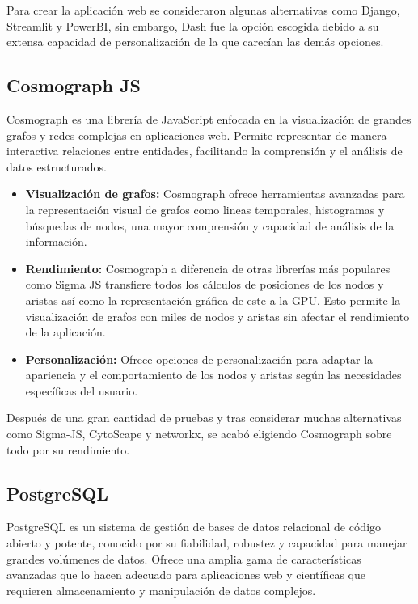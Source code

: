 \noindent Para crear la aplicación web se consideraron algunas alternativas como Django, Streamlit y PowerBI, sin embargo, Dash fue la opción escogida debido a su extensa capacidad de personalización de la que carecían las demás opciones.

\subsection{Cosmograph JS}

Cosmograph es una librería de JavaScript enfocada en la visualización de grandes grafos y redes complejas en aplicaciones web. Permite representar de manera interactiva relaciones entre entidades, facilitando la comprensión y el análisis de datos estructurados.

\begin{itemize}
	\item \textbf{Visualización de grafos:} Cosmograph ofrece herramientas avanzadas para la representación visual de grafos como lineas temporales, histogramas y búsquedas de nodos, una mayor comprensión y capacidad de análisis de la información.

	\item \textbf{Rendimiento:} Cosmograph a diferencia de otras librerías más populares como Sigma JS transfiere todos los cálculos de posiciones de los nodos y aristas así como la representación gráfica de este a la GPU. Esto permite la visualización de grafos con miles de nodos y aristas sin afectar el rendimiento de la aplicación.

	\item \textbf{Personalización:} Ofrece opciones de personalización para adaptar la apariencia y el comportamiento de los nodos y aristas según las necesidades específicas del usuario.

\end{itemize}

\noindent Después de una gran cantidad de pruebas y tras considerar muchas alternativas como Sigma-JS, CytoScape y networkx, se acabó eligiendo Cosmograph sobre todo por su rendimiento.

\subsection{PostgreSQL}

PostgreSQL es un sistema de gestión de bases de datos relacional de código abierto y potente, conocido por su fiabilidad, robustez y capacidad para manejar grandes volúmenes de datos. Ofrece una amplia gama de características avanzadas que lo hacen adecuado para aplicaciones web y científicas que requieren almacenamiento y manipulación de datos complejos.

